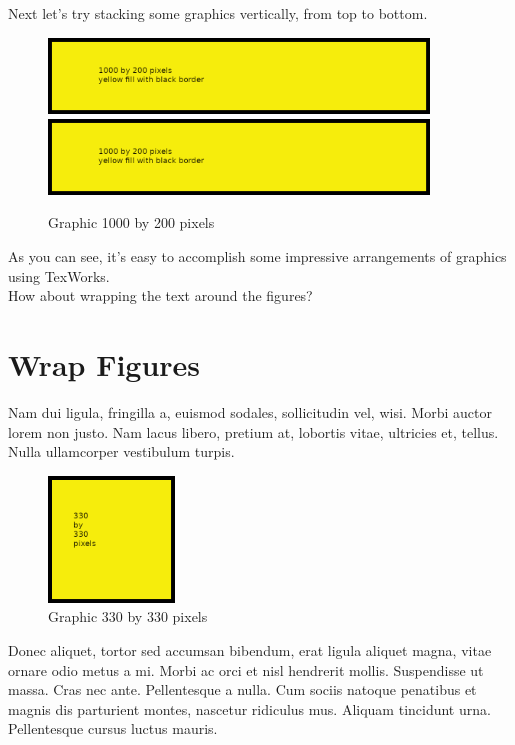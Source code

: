 Next let's try stacking some graphics vertically, from top to bottom.
\begin{figure}[H]
\centering
\includegraphics[width=0.9\textwidth]{1000x200}
\includegraphics[width=0.9\textwidth]{1000x200}
\caption{Graphic 1000 by 200 pixels}\label{fg:1000x200-5}
\end{figure}

As you can see, it's easy to accomplish some impressive arrangements of graphics using TexWorks.\\

How about wrapping the text around the figures?

\section{Wrap Figures}

Nam dui ligula, fringilla a, euismod sodales, sollicitudin vel, wisi. Morbi auctor lorem non justo. Nam lacus libero, pretium at, lobortis vitae, ultricies et, tellus.   Nulla ullamcorper vestibulum turpis.

\begin{figure}
\centering
\includegraphics[width=0.3\textwidth]{330x330}
\caption{Graphic 330 by 330 pixels}\label{fg:330x330}
\end{figure}

Donec aliquet, tortor sed accumsan bibendum, erat ligula aliquet magna, vitae ornare odio metus a mi. Morbi ac orci et nisl hendrerit mollis. Suspendisse ut massa. Cras nec ante. Pellentesque a nulla. Cum sociis natoque penatibus et magnis dis parturient montes, nascetur ridiculus mus. Aliquam tincidunt urna. Pellentesque cursus luctus mauris.


